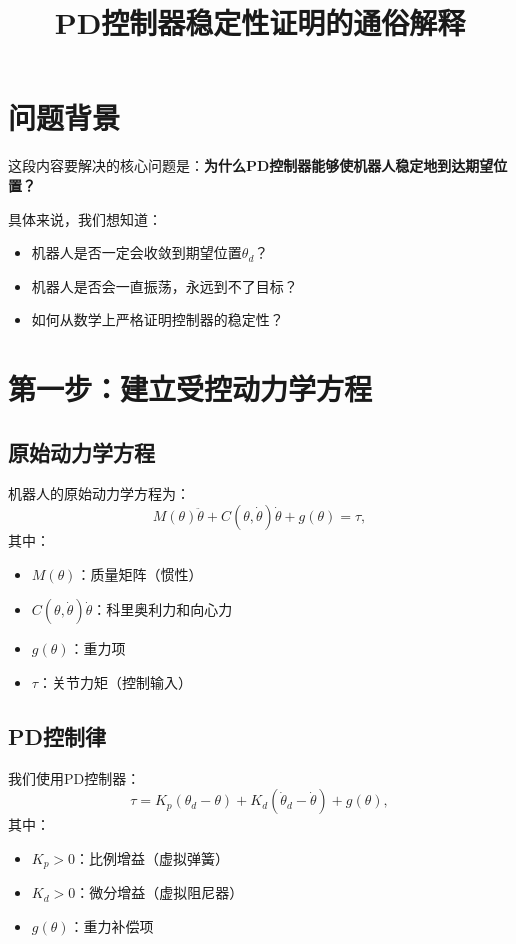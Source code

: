\documentclass{article}
\title{PD控制器稳定性证明的通俗解释}
\author{}
\date{}
\begin{document}
\maketitle

\section{问题背景}

这段内容要解决的核心问题是：\textbf{为什么PD控制器能够使机器人稳定地到达期望位置？}

具体来说，我们想知道：
\begin{itemize}
\item 机器人是否一定会收敛到期望位置$\theta_d$？
\item 机器人是否会一直振荡，永远到不了目标？
\item 如何从数学上严格证明控制器的稳定性？
\end{itemize}

\section{第一步：建立受控动力学方程}

\subsection{原始动力学方程}

机器人的原始动力学方程为：
\begin{equation}
M(\theta)\ddot{\theta} + C(\theta, \dot{\theta})\dot{\theta} + g(\theta) = \tau,
\end{equation}
其中：
\begin{itemize}
\item $M(\theta)$：质量矩阵（惯性）
\item $C(\theta, \dot{\theta})\dot{\theta}$：科里奥利力和向心力
\item $g(\theta)$：重力项
\item $\tau$：关节力矩（控制输入）
\end{itemize}

\subsection{PD控制律}

我们使用PD控制器：
\begin{equation}
\tau = K_p(\theta_d - \theta) + K_d(\dot{\theta}_d - \dot{\theta}) + g(\theta),
\end{equation}
其中：
\begin{itemize}
\item $K_p > 0$：比例增益（虚拟弹簧）
\item $K_d > 0$：微分增益（虚拟阻尼器）
\item $g(\theta)$：重力补偿项
\end{itemize}
\end{document}
